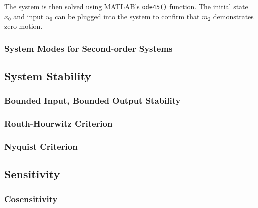 \documentclass[../notes.tex]{subfiles}
\begin{document}
The system is then solved using MATLAB's \verb|ode45()| function. The initial state $x_0$ and input $u_0$ can be plugged into the system to confirm that $m_2$ demonstrates zero motion.

\subsubsection{System Modes for Second-order Systems}

\subsection{System Stability}
\subsubsection{Bounded Input, Bounded Output Stability} \label{sec:BIBO}
\subsubsection{Routh-Hourwitz Criterion}
\subsubsection{Nyquist Criterion}

\subsection{Sensitivity}
\subsubsection{Cosensitivity}

\end{document}
